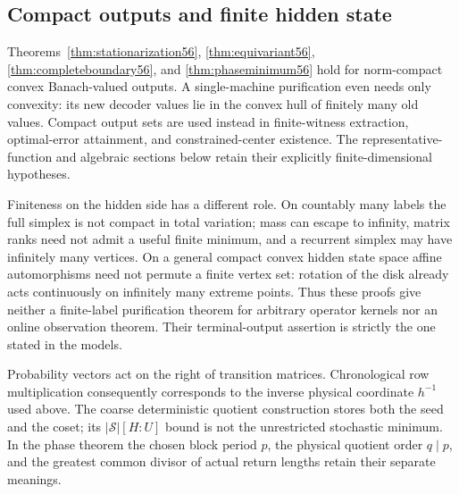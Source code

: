 \subsection{Compact outputs and finite hidden state}
Theorems~\ref{thm:stationarization56}, \ref{thm:equivariant56}, \ref{thm:completeboundary56}, and \ref{thm:phaseminimum56} hold for norm-compact convex Banach-valued outputs. A single-machine purification even needs only convexity: its new decoder values lie in the convex hull of finitely many old values. Compact output sets are used instead in finite-witness extraction, optimal-error attainment, and constrained-center existence. The representative-function and algebraic sections below retain their explicitly finite-dimensional hypotheses.

Finiteness on the hidden side has a different role. On countably many labels the full simplex is not compact in total variation; mass can escape to infinity, matrix ranks need not admit a useful finite minimum, and a recurrent simplex may have infinitely many vertices. On a general compact convex hidden state space affine automorphisms need not permute a finite vertex set: rotation of the disk already acts continuously on infinitely many extreme points. Thus these proofs give neither a finite-label purification theorem for arbitrary operator kernels nor an online observation theorem. Their terminal-output assertion is strictly the one stated in the models.

\begin{remark}
Probability vectors act on the right of transition matrices. Chronological
row multiplication consequently corresponds to the inverse physical
coordinate $h^{-1}$ used above. The coarse deterministic quotient
construction stores both the seed and the coset; its
$|\mathcal S|[H:U]$ bound is not the unrestricted stochastic minimum.
In the phase theorem the chosen block period $p$, the physical quotient
order $q\mid p$, and the greatest common divisor of actual return
lengths retain their separate meanings.
\end{remark}
